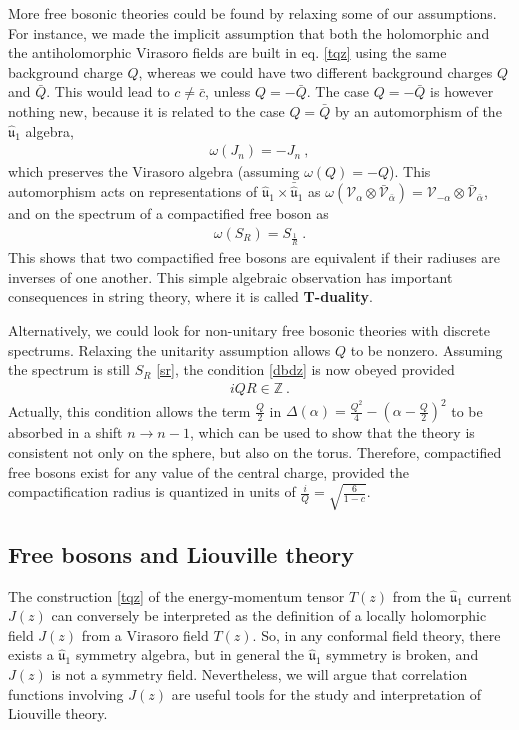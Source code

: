 \documentclass[12pt, a4paper, notitlepage, twoside]{report}
\numberwithin{equation}{section}
\theoremstyle{break}
\begin{document}
More free bosonic theories could be found by relaxing some of our assumptions.
For instance, we made the implicit assumption that both the holomorphic and the antiholomorphic Virasoro fields are built in eq. \eqref{tqz} using the same background charge $Q$, whereas we could have two different background charges $Q$ and $\bar{Q}$.
This would lead to $c\neq \bar{c}$, unless $Q=- \bar{Q}$. 
The case $Q=-\bar{Q}$ is however nothing new, because it is related to the case $Q=\bar{Q}$ by an automorphism of the $\hat{\mathfrak{u}}_1$ algebra,
\begin{align}
 \omega(J_n) = -J_n \ ,
\end{align}
which preserves the Virasoro algebra (assuming $\omega(Q)=-Q$).
This automorphism acts on representations of $\hat{\mathfrak{u}}_1 \times \bar{\hat{\mathfrak{u}}}_1$ as $\omega(\mathcal{V}_\alpha \otimes \bar{\mathcal{V}}_{\bar{\alpha}}) =  \mathcal{V}_{-\alpha} \otimes \bar{\mathcal{V}}_{\bar{\alpha}}$, and on the spectrum of a compactified free boson as 
\begin{align}
 \omega(S_R) = S_{\frac{1}{R}}\ .
\end{align}
This shows that two compactified free bosons are equivalent if their radiuses are inverses of one another.
This simple algebraic observation has important consequences in string theory, where it is called \textbf{\boldmath T-duality}. 

Alternatively, we could look for non-unitary free bosonic theories with discrete spectrums.
Relaxing the unitarity assumption allows $Q$ to be nonzero.
Assuming the spectrum is still $S_R$ \eqref{sr}, the condition \eqref{dbdz} is now obeyed provided 
\begin{align}
 iQR\in {\mathbb{Z}} \ .
\end{align}
Actually, this condition allows the term $\frac{Q}{2}$ in $\Delta(\alpha)=\frac{Q^2}{4}-(\alpha-\frac{Q}{2})^2$ to be absorbed in a shift $n\to n-1$, which can be used to show that the theory is consistent not only on the sphere, but also on the torus. 
Therefore, compactified free bosons exist for any value of the central charge, provided the compactification radius is quantized in units of $\frac{i}{Q}=\sqrt{\frac{6}{1-c}}$. 

\subsection{Free bosons and Liouville theory \label{seclld}}

The construction \eqref{tqz} of the energy-momentum tensor $T(z)$ from the $\hat{\mathfrak{u}}_1$ current $J(z)$ can conversely be interpreted as the definition of a locally holomorphic field $J(z)$ from a Virasoro field $T(z)$.
So, in any conformal field theory, there exists a $\hat{\mathfrak{u}}_1$ symmetry algebra, but in general the $\hat{\mathfrak{u}}_1$ symmetry is broken, and $J(z)$ is not a symmetry field.
Nevertheless, we will argue that correlation functions involving $J(z)$ are useful tools for the study and interpretation of Liouville theory. 
\end{document}
